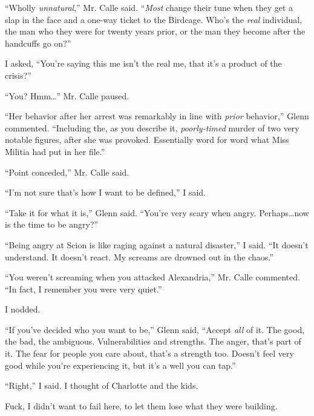 ``Wholly \emph{unnatural},'' Mr. Calle said.  ``\emph{Most }change their tune when they get a slap in the face and a one-way ticket to the Birdcage.  Who's the \emph{real} individual, the man who they were for twenty years prior, or the man they become after the handcuffs go on?''



I asked, ``You're saying this me isn't the real me, that it's a product of the crisis?''



``You?  Hmm\ldots'' Mr. Calle paused.



``Her behavior after her arrest was remarkably in line with \emph{prior} behavior,'' Glenn commented.  ``Including the, as you describe it, \emph{poorly-timed} murder of two very notable figures, after she was provoked.  Essentially word for word what Miss Militia had put in her file.''



``Point conceded,'' Mr. Calle said.



``I'm not sure that's how I want to be defined,'' I said.



``Take it for what it is,'' Glenn said.  ``You're very scary when angry.  Perhaps\ldots now is the time to be angry?''



``Being angry at Scion is like raging against a natural disaster,'' I said.  ``It doesn't understand.  It doesn't react.  My screams are drowned out in the chaos.''



``You weren't screaming when you attacked Alexandria,'' Mr. Calle commented.  ``In fact, I remember you were very quiet.''



I nodded.



``If you've decided who you want to be,'' Glenn said, ``Accept \emph{all} of it.  The good, the bad, the ambiguous.  Vulnerabilities and strengths.  The anger, that's part of it.  The fear for people you care about, that's a strength too.  Doesn't feel very good while you're experiencing it, but it's a well you can tap.''



``Right,'' I said.  I thought of Charlotte and the kids.



Fuck, I didn't want to fail here, to let them lose what they were building.



